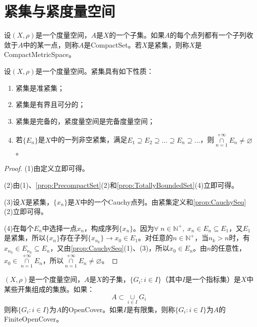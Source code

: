 \section{紧集与紧度量空间}
\begin{definition}
	设$(X,\rho)$是一个度量空间，$A$是$X$的一个子集。如果$A$的每个点列都有一个子列收敛于$A$中的某一点，则称$A$是\gls{CompactSet}。若$X$是紧集，则称$X$是\gls{CompactMetricSpace}。
\end{definition}

\begin{property}
	设$(X,\rho)$是一个度量空间。紧集具有如下性质：
	\begin{enumerate}
		\item 紧集是准紧集；
		\item 紧集是有界且可分的；
		\item 紧集是完备的，紧度量空间是完备度量空间；
		\item 若$\{E_n\}$是$X$中的一列非空紧集，满足$E_1\supseteq E_2\supseteq\dots\supseteq E_n\supseteq\dots$，则$\underset{n=1}{\overset{+\infty}{\cap}}E_n\ne\varnothing$。
	\end{enumerate}
\end{property}
\begin{proof}
	(1)由定义立即可得。\par
	(2)由(1)、\cref{prop:PrecompactSet}(2)和\cref{prop:TotallyBoundedSet}(4)立即可得。\par
	(3)设$X$是紧集，$\{x_n\}$是$X$中的一个Cauchy点列。由紧集定义和\cref{prop:CauchySeq}(2)立即可得。\par
	(4)在每个$E_n$中选择一点$x_n$，构成序列$\{x_n\}$。因为$\forall\;n\in\mathbb{N}^+,\;x_n\in E_n\subseteq E_1$，又$E_1$是紧集，所以$\{x_n\}$存在子列$\{x_{n_k}\}\rightarrow x_0\in E_1$。对任意的$n\in\mathbb{N}^+$，当$n_k>n$时，有$x_{n_k}\in E_{n_k}\subseteq E_n$，又由\cref{prop:CauchySeq}(1)、(3)，所以$x_0\in E_n$。由$n$的任意性，$x_0\in\underset{n=1}{\overset{+\infty}{\cap}}E_n$，所以$\underset{n=1}{\overset{+\infty}{\cap}}E_n\ne\varnothing$。
\end{proof}
\begin{definition}
	$(X,\rho)$是一个度量空间，$A$是$X$的子集，$\{G_i:i\in I\}$（其中$I$是一个指标集）是$X$中某些开集组成的集族。如果：
	\begin{equation*}
		A\subset\underset{i\in I}{\cup}G_i
	\end{equation*}
	则称$\{G_i:i\in I\}$为$A$的\gls{OpenCover}。如果$I$是有限集，则称$\{G_i:i\in I\}$为$A$的\gls{FiniteOpenCover}。
\end{definition}
